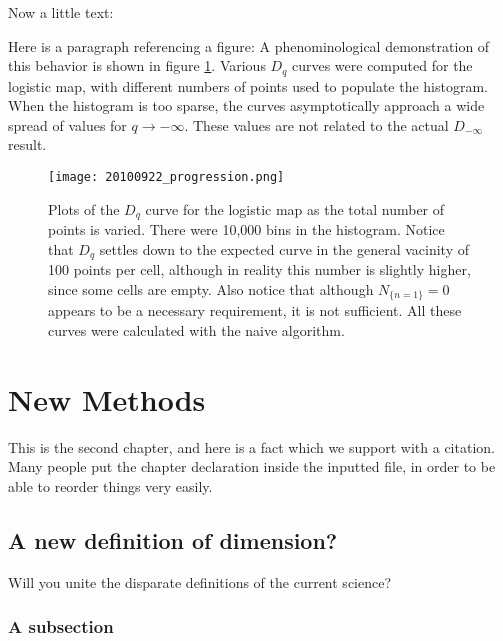 \documentclass[draft]{csuthesis} %
\begin{document}
Now a little text: \lipsum[1-2]

Here is a paragraph referencing a figure: A phenominological demonstration of this behavior is shown in figure \ref{2010_09_sparse1d}.  Various $D_q$ curves were computed for the logistic map, with different numbers of points used to populate the histogram.  When the histogram is too sparse, the curves asymptotically approach a wide spread of values for $q\to -\infty$.  These values are not related to the actual $D_{-\infty}$ result.

\begin{figure}[!ht]
\texttt{[image: 20100922\_progression.png]}
\caption[Plots demonstrating the effect of sparse data on $D_q$ convergence.]{Plots of the $D_q$ curve for the logistic map as the total number of points is varied.  There were 10,000 bins in the histogram.  Notice that $D_q$ settles down to the expected curve in the general vacinity of 100 points per cell, although in reality this number is slightly higher, since some cells are empty.  Also notice that although $N_{\{n=1\}}=0$ appears to be a necessary requirement, it is not sufficient.  All these curves were calculated with the naive algorithm. \label{2010_09_sparse1d}}
\end{figure}

\chapter{New Methods}

This is the second chapter, and here is a fact which we support with a citation\cite{coxlittleoshea}.  Many people put the chapter declaration inside the inputted file\cite{Yorke1989}, in order to be able to reorder things very easily\cite{robot_homotopy}.  

\section{A new definition of dimension?}

Will you unite the disparate definitions of the current science? \lipsum[1]

\subsection{A subsection}
\end{document}
